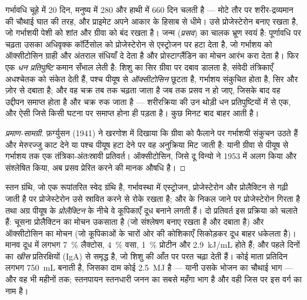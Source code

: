 \begin{proposition}[गर्भावधि और जन्म]\label{prop:b2:mammal-reproduction:birth}
गर्भावधि चूहे में \num{20} दिन, मनुष्य में \num{280} और हाथी में \num{660}
दिन चलती है --- मोटे तौर पर शरीर-द्रव्यमान की चौथाई घात की तरह, और
प्राइमेट अपने आकार के हिसाब से धीमे। उसे प्रोजेस्टेरोन बनाए रखता है,
जो गर्भाशयी पेशी को शांत और ग्रीवा को बंद रखता है। जन्म
(\emph{प्रसव}) का चालक भ्रूण स्वयं है: पूर्णावधि पर चढ़ता उसका
अधिवृक्क कॉर्टिसोल  को प्रोजेस्टेरोन से एस्ट्रोजन पर
हटा देता है, जो गर्भाशय को ऑक्सीटोसिन ग्राही और अंतराल संधियाँ दे देता है
और प्रोस्टाग्लैंडिन का मोचन आरंभ करा देता है। फिर एक \emph{धन
प्रतिपुष्टि} कमान सँभाल लेती है: शिशु का सिर ग्रीवा पर दबाव डालता है,
संवेदी तंत्रिकाएँ अधश्चेतक को संकेत देती हैं, पश्च पीयूष से
\emph{ऑक्सीटोसिन} छूटता है, गर्भाशय संकुचित होता है, सिर और ज़ोर से
दबाता है; और वह चक्र तब तक चढ़ता जाता है जब तक प्रसव न हो जाए, जिसके बाद
वह उद्दीपन समाप्त होता है और चक्र रुक जाता है --- शरीरक्रिया की उन थोड़ी
धन प्रतिपुष्टियों में से एक, और ऐसी जिसे किसी घटना पर समाप्त होना ही
पड़ता है।  कुछ मिनट बाद बाहर आती है।
\end{proposition}
\begin{proof}[प्रमाण-सामग्री]
फ़र्ग्युसन (1941) ने खरगोश में दिखाया कि ग्रीवा को फैलाने पर
गर्भाशयी संकुचन उठते हैं और मेरुरज्जु काट देने या पश्च पीयूष
हटा देने पर वह अनुक्रिया मिट जाती है: यानी ग्रीवा से पीयूष से गर्भाशय तक
एक तंत्रिका-अंतःस्रावी प्रतिवर्त। ऑक्सीटोसिन, जिसे
दू विन्यो ने 1953 में अलग किया और संश्लेषित किया, अब प्रसव प्रेरित करने
की मानक औषधि है।
\end{proof}

\begin{proposition}[स्तनपायन]\label{prop:b2:mammal-reproduction:lactation}
स्तन ग्रंथि, जो एक रूपांतरित स्वेद ग्रंथि है, गर्भावस्था में एस्ट्रोजन,
प्रोजेस्टेरोन और प्रोलैक्टिन से गढ़ी जाती है पर प्रोजेस्टेरोन उसे
स्रावित करने से रोके रखता है; और  के निकल जाने पर प्रोजेस्टेरोन
गिरता है तथा अग्र पीयूष के \emph{प्रोलैक्टिन} के नीचे वे
कूपिकाएँ दूध बनाने लगती हैं। दो प्रतिवर्त इस प्रक्रिया को चलाते हैं:
चूसना प्रोलैक्टिन का मोचन उकसाता है (जो संश्लेषण बनाए रखता है और
 दबाता है) और ऑक्सीटोसिन का मोचन (जो कूपिकाओं के चारों ओर की
कोशिकाएँ सिकोड़कर दूध बाहर धकेलता है)। मानव दूध में
लगभग \qty{7}{\%} लैक्टोस, \qty{4}{\%} वसा, \qty{1}{\%} प्रोटीन और
\qty{2.9}{kJ/mL} होते हैं; और पहले दिनों का \emph{खीस}
प्रतिरक्षियों (IgA) से समृद्ध है, जो शिशु की आँत पर परत चढ़ा देती हैं।
कोई माता प्रतिदिन लगभग \qty{750}{mL} बनाती है, जिसका दाम कोई
\qty{2.5}{MJ} है --- यानी उसके भोजन का चौथाई भाग --- और वह भी
महीनों तक; स्तनपायन स्तनधारी जनन का सबसे महँगा भाग है और वही जिस पर इस
वर्ग का नाम है।
\end{proposition}

